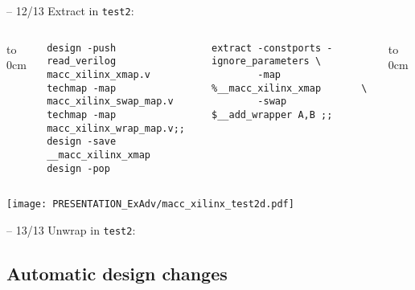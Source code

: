 \begin{frame}[t, fragile]{\subsubsecname{} -- 12/13}
Extract in {\tt test2}:
\begin{columns}
\column[t]{4.5cm}
\vbox to 0cm{
\begin{lstlisting}[linewidth=5cm, basicstyle=\ttfamily\fontsize{8pt}{10pt}\selectfont, language=ys]
design -push
read_verilog macc_xilinx_xmap.v
techmap -map macc_xilinx_swap_map.v
techmap -map macc_xilinx_wrap_map.v;;
design -save __macc_xilinx_xmap
design -pop
\end{lstlisting}
\vss}
\column[t]{5.5cm}
\vskip-1cm
\begin{lstlisting}[linewidth=5.5cm, basicstyle=\ttfamily\fontsize{8pt}{10pt}\selectfont, language=ys]
extract -constports -ignore_parameters \
        -map %__macc_xilinx_xmap       \
        -swap $__add_wrapper A,B ;;
\end{lstlisting}
\vbox to 0cm{\vss}
\end{columns}

\vskip2cm
\hfil\texttt{[image: PRESENTATION\_ExAdv/macc\_xilinx\_test2d.pdf]}
\end{frame}

\begin{frame}[t, fragile]{\subsubsecname{} -- 13/13}
Unwrap in {\tt test2}:

\hfil{}
\end{frame}



\subsection{Automatic design changes}

